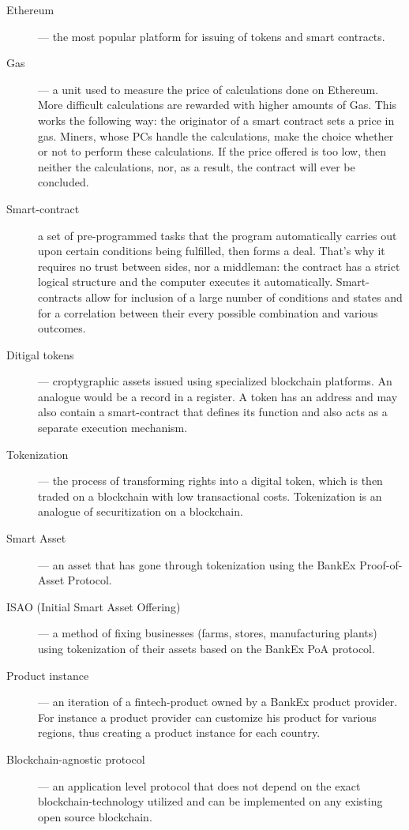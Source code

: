 \documentclass{article}
\begin{document}
\begin{description}
\item[Ethereum]--- the most popular platform for issuing of tokens and smart contracts. 
\item[Gas]--- a unit used to measure the price of calculations done on Ethereum. More difficult calculations are rewarded with higher amounts of Gas. This works the following way: the originator of a smart contract sets a price in gas. Miners, whose PCs handle the calculations, make the choice whether or not to perform these calculations. If the price offered is too low, then neither the calculations, nor, as a result, the contract will ever be concluded. 
\item[Smart-contract] a set of pre-programmed tasks that the program automatically carries out upon certain conditions being fulfilled, then forms a deal. That’s why it requires no trust between sides, nor a middleman: the contract has a strict logical structure and the computer executes it automatically. Smart-contracts allow for inclusion of a large number of conditions and states and for a correlation between their every possible combination and various outcomes. 
\item[Ditigal tokens]--- croptygraphic assets issued using specialized blockchain platforms. An analogue would be a record in a register. A token has an address and may also contain a smart-contract that defines its function and also acts as a separate execution mechanism. 
\item[Tokenization]--- the process of transforming rights into a digital token, which is then traded on a blockchain with low transactional costs. Tokenization is an analogue of securitization on a blockchain. 
\item[Smart Asset]--- an asset that has gone through tokenization using the BankEx Proof-of-Asset Protocol. 
\item[ISAO (Initial Smart Asset Offering)]--- a method of fixing businesses (farms, stores, manufacturing plants) using tokenization of their assets based on the BankEx PoA protocol. 
\item[Product instance]--- an iteration of a fintech-product owned by a BankEx product provider. For instance a product provider can customize his product for various regions, thus creating a product instance for each country. 
\item[Blockchain-agnostic protocol]--- an application level protocol that does not depend on the exact blockchain-technology utilized and can be implemented on any existing open source blockchain. 
\end{description}

\printbibliography
\end{document}
